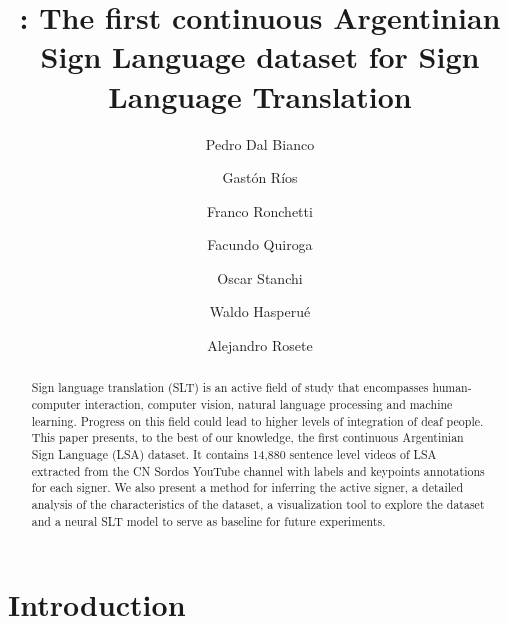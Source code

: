 \documentclass[runningheads]{llncs}
\begin{document}
\title{\dbname: The first continuous Argentinian Sign Language dataset for Sign Language Translation}

\author{
Pedro Dal Bianco \and
Gastón Ríos \and
Franco Ronchetti \and
Facundo Quiroga \and
Oscar Stanchi \and
Waldo Hasperué \and
Alejandro Rosete  
}
%
%
%
\maketitle              %
%
\begin{abstract}
Sign language translation (SLT) is an active field of study that encompasses human-computer interaction, computer vision, natural language processing and machine learning. Progress on this field could lead to higher levels of integration of deaf people. This paper presents, to the best of our knowledge, the first continuous Argentinian Sign Language (LSA) dataset. It contains 14,880 sentence level videos of LSA extracted from the CN Sordos YouTube channel with labels and keypoints annotations for each signer. We also present a method for inferring the active signer, a detailed analysis of the characteristics of the dataset, a visualization tool to explore the dataset and a neural SLT model to serve as baseline for future experiments.

\end{abstract}

\section{Introduction}
\label{sec:intro}

\end{document}
